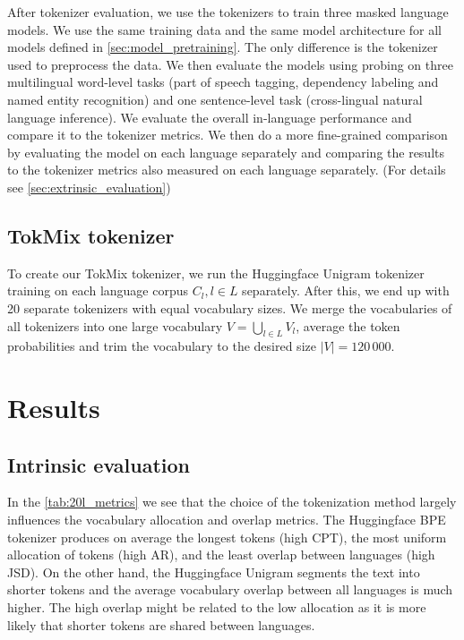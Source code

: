 After tokenizer evaluation, we use the tokenizers to train three masked language models. We use the same training data and the same model architecture for all models defined in \autoref{sec:model_pretraining}. The only difference is the tokenizer used to preprocess the data. We then evaluate the models using probing on three multilingual word-level tasks (part of speech tagging, dependency labeling and named entity recognition) and one sentence-level task (cross-lingual natural language inference).
We evaluate the overall in-language performance and compare it to the tokenizer metrics. We then do a more fine-grained comparison by evaluating the model on each language separately and comparing the results to the tokenizer metrics also measured on each language separately. (For details see \autoref{sec:extrinsic_evaluation}) 





\subsection{TokMix tokenizer}

To create our TokMix tokenizer, we run the Huggingface Unigram tokenizer training on each language corpus $C_l, l \in L$ separately. After this, we end up with 20 separate tokenizers with equal vocabulary sizes. We merge the vocabularies of all tokenizers into one large vocabulary $V = \bigcup_{l \in L} V_l$, average the token probabilities and trim the vocabulary to the desired size $|V| = 120\,000$. 

\section{Results}
\subsection{Intrinsic evaluation}



In the \autoref{tab:20l_metrics} we see that the choice of the tokenization method largely influences the vocabulary allocation and overlap metrics. The Huggingface BPE tokenizer produces on average the longest tokens (high CPT), the most uniform allocation of tokens (high AR), and the least overlap between languages (high JSD). On the other hand, the Huggingface Unigram segments the text into shorter tokens and the average vocabulary overlap between all languages is much higher. The high overlap might be related to the low allocation as it is more likely that shorter tokens are shared between languages. 


